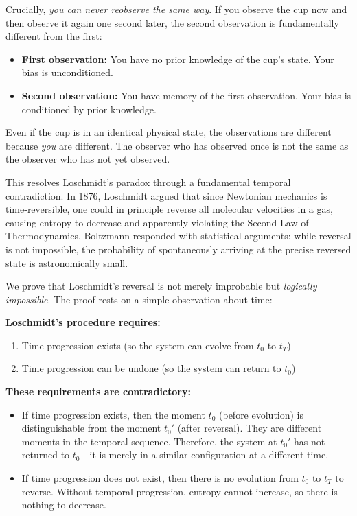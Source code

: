 \documentclass[twocolumn,10pt]{article}
\theoremstyle{definition}
\theoremstyle{remark}
\begin{document}
\vspace{0.2cm}
\noindent Crucially, \textit{you can never reobserve the same way}. If you observe the cup now and then observe it again one second later, the second observation is fundamentally different from the first:
\begin{itemize}
\item \textbf{First observation:} You have no prior knowledge of the cup's state. Your bias is unconditioned.
\item \textbf{Second observation:} You have memory of the first observation. Your bias is conditioned by prior knowledge.
\end{itemize}
Even if the cup is in an identical physical state, the observations are different because \textit{you} are different. The observer who has observed once is not the same as the observer who has not yet observed.

\vspace{0.2cm}
\noindent This resolves Loschmidt's paradox\cite{loschmidt1876,loschmidt1877} through a fundamental temporal contradiction. In 1876, Loschmidt argued that since Newtonian mechanics is time-reversible, one could in principle reverse all molecular velocities in a gas, causing entropy to decrease and apparently violating the Second Law of Thermodynamics. Boltzmann responded with statistical arguments\cite{boltzmann1877}: while reversal is not impossible, the probability of spontaneously arriving at the precise reversed state is astronomically small.

\vspace{0.2cm}
\noindent We prove that Loschmidt's reversal is not merely improbable but \textit{logically impossible}. The proof rests on a simple observation about time:

\vspace{0.2cm}
\noindent\textbf{Loschmidt's procedure requires:}
\begin{enumerate}
\item Time progression exists (so the system can evolve from $t_0$ to $t_T$)
\item Time progression can be undone (so the system can return to $t_0$)
\end{enumerate}

\vspace{0.2cm}
\noindent\textbf{These requirements are contradictory:}
\begin{itemize}
\item If time progression exists, then the moment $t_0$ (before evolution) is distinguishable from the moment $t_0'$ (after reversal). They are different moments in the temporal sequence. Therefore, the system at $t_0'$ has not returned to $t_0$—it is merely in a similar configuration at a different time.
\item If time progression does not exist, then there is no evolution from $t_0$ to $t_T$ to reverse. Without temporal progression, entropy cannot increase, so there is nothing to decrease.
\end{itemize}
\end{document}
